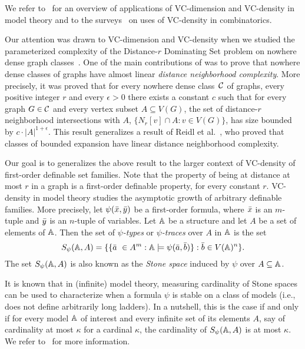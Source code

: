 We refer to~\cite{aschenbrenner2016vapnik} for an overview of 
applications of VC-dimension and VC-density in model
theory and to the surveys~\cite{furedi1991traces,matouvsek1998geometric} 
on uses of VC-density in
combinatorics. 

Our attention was drawn to VC-dimension and 
VC-density when we studied the parameterized 
complexity of the {\sc Distance-$r$ Dominating Set} 
problem on nowhere dense graph classes~\cite{eickmeyer2016neighborhood}. 
One of the main contributions of \cite{eickmeyer2016neighborhood}
was to prove that nowhere dense classes of graphs have almost linear
\emph{distance neighborhood complexity}. More precisely, it
was proved that for every nowhere dense class~$\mathcal{C}$ of 
graphs, every positive integer $r$ and every $\epsilon>0$ there
exists a constant $c$ such that for every graph $G\in\mathcal{C}$ and
every vertex subset $A\subseteq V(G)$, the set of distance-$r$ neighborhood intersections with $A$,
$\{N_r[v]\cap A \colon v\in V(G)\}$,
has size bounded by $c\cdot |A|^{1+\epsilon}$. This result
generalizes a result of Reidl et al.~\cite{reidl2016characterising}, who proved that classes of bounded expansion have linear distance neighborhood complexity. 

Our goal is to generalizes the above result to the larger context of VC-density of first-order definable set families.
Note that the property of being at distance at most $r$ in a graph is 
a first-order definable property, for every constant $r$.
VC-density in model theory studies the asymptotic growth 
of arbitrary definable families. More precisely, 
let $\psi(\bar{x},\bar{y})$ be a first-order formula, where 
$\bar{x}$ is an $m$-tuple and $\bar{y}$ is an $n$-tuple of variables. 
Let $\mathbb{A}$ be a structure and let $A$ be a set of elements of
$\mathbb{A}$. Then the set of \emph{$\psi$-types} or 
\emph{$\psi$-traces} over $A$ in 
$\mathbb{A}$ is the set
\[S_\psi(\mathbb{A},A)=\{\{\bar{a}\ \in A^m : \mathbb{A}\models\psi(\bar{a},\bar{b})\} : \bar{b}\in V(\mathbb{A})^n\}.\]
The set $S_\psi(\mathbb{A},A)$ is also known as the {\em{Stone space}} induced by $\psi$ over $A\subseteq \mathbb{A}$.

It is known that in (infinite) model theory,
measuring cardinality of Stone spaces can be used to characterize when a formula $\psi$ is stable on a class of models (i.e., does not define arbitrarily long ladders).
In a nutshell, this is the case if and only if for every model $\mathbb{A}$ of interest and every infinite set of its elements $A$, say of cardinality at most $\kappa$ for a cardinal $\kappa$,
the cardinality of $S_\psi(\mathbb{A},A)$ is at most $\kappa$. We refer to~\cite{} for more information.

